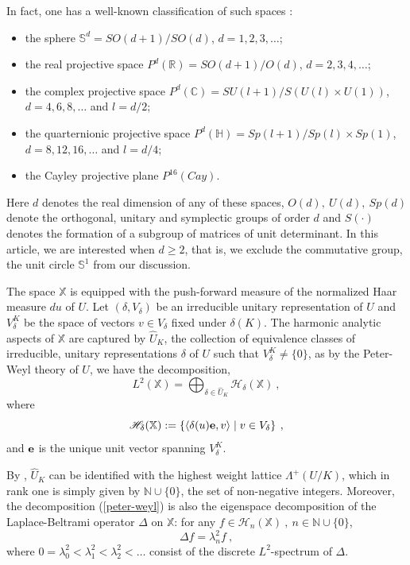 \documentclass[12pt]{amsart}
\theoremstyle{definition}
\newcommand{\what}{\widehat}
\newcommand{\R}{\mathbb R}%
\newcommand{\C}{\mathbb C}%
\newcommand{\N}{\mathbb N}%
\newcommand{\Sb}{\mathbb S}%
\newcommand{\X}{\mathbb X}%
\newcommand{\Hb}{\mathbb H}%
\numberwithin{equation}{section}
\begin{document}
In fact, one has a well-known classification of such spaces \cite{Wang}: 
\begin{itemize}
\item the sphere $\Sb^d =SO(d+1)/SO(d)$, $d=1,2,3,\dots$;
\item the real projective space $P^d(\R)=SO(d+1)/O(d)$, $d=2,3,4,\dots$;
\item the complex projective space $P^d(\C)=SU(l+1)/S(U(l) \times U(1))$, $d=4,6,8,\dots$ and $l=d/2$;
\item the quarternionic projective space $P^d(\Hb)=Sp(l+1)/Sp(l) \times Sp(1)$, $d=8,12,16,\dots$ and $l=d/4$;
\item the Cayley projective plane $P^{16}(Cay)$.
\end{itemize}
Here $d$ denotes the real dimension of any of these spaces, $O(d),\:U(d),\:Sp(d)$ denote the orthogonal, unitary and symplectic groups of order $d$ and $S(\cdot)$ denotes the formation of a subgroup of matrices of unit determinant. In this article, we are interested when $d \ge 2$, that is, we exclude the commutative group, the unit circle $\Sb^1$ from our discussion.

The space $\X$ is equipped with the push-forward measure of the normalized Haar measure $du$ of $U$. Let $(\delta,V_\delta)$ be an irreducible unitary representation of $U$ and $V^K_\delta$ be the space of vectors $v \in V_\delta$ fixed under $\delta(K)$. The harmonic analytic aspects of $\X$ are captured by $\what{U}_K$, the collection of equivalence classes of irreducible, unitary representations $\delta$ of $U$ such that $V^K_\delta \ne \{0\}$, as by the Peter-Weyl theory of $U$, we have the decomposition,
\begin{equation} \label{peter-weyl}
L^2(\X) = \bigoplus_{\delta \in \what{U}_K} \mathscr{H}_\delta(\X)\:,
\end{equation}
where
\begin{equation*}
\mathscr{H}_\delta(\X):= \left\{\langle \delta(u){\bf e}, v   \rangle \mid v \in V_\delta\right\}\:,
\end{equation*}
and ${\bf e}$ is the unique unit vector spanning $V^K_\delta$.

By \cite[Theorem 4.1, p. 535]{Helgason}, $\what{U}_K$ can be identified with the highest weight lattice $\Lambda^+(U/K)$, which in rank one is simply given by $\N \cup \{0\}$, the set of non-negative integers. Moreover, the decomposition (\ref{peter-weyl}) is also the eigenspace decomposition of the Laplace-Beltrami operator $\Delta$ on $\X$: for any $f \in \mathscr{H}_n(\X)\:,\:n \in \N \cup \{0\}$,
\begin{equation*}
\Delta f = \lambda^2_n f\:,
\end{equation*}
where $0=\lambda^2_0<\lambda^2_1<\lambda^2_2< \dots$ consist of the discrete $L^2$-spectrum of $\Delta$.
\end{document}
